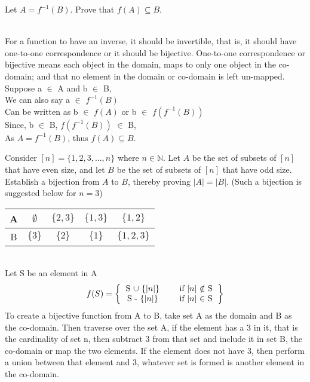\documentclass[addpoints]{exam}
\begin{document}
\begin{questions}
\begin{parts}
\begin{solution}
  \end{solution}

\end{parts}

\question[15] Let $A = f^{-1}(B)$. Prove that $f(A) \subseteq B$.
  \begin{solution}
    \\
    For a function to have an inverse, it should be invertible, that is, it should have one-to-one correspondence or it should be bijective. One-to-one correspondence or bijective means each object in the domain, maps to only one object in the co-domain; and that no element in the domain or co-domain is left un-mapped. \\ Suppose a $\in$ A and b $\in$ B, \\ We can also say a $\in$ $f^{-1}(B)$ \\ Can be written as b $\in$ $f(A)$ or b $\in$ $f(f^{-1}(B))$ \\ Since, b $\in$ B, \hspace{1cm} $f(f^{-1}(B))$ $\in$ B, \\ As $A = f^{-1}(B)$, thus $f(A) \subseteq B$.
  \end{solution}

\question[15] Consider $[n] = \{1,2,3,...,n\}$ where $n \in \mathbb{N}$. Let $A$ be the set of subsets of $[n]$ that have even size, and let $B$ be the set of subsets of $[n]$ that have odd size. Establish a bijection from $A$ to $B$, thereby proving $|A| = |B|$. (Such a bijection is suggested below for $n = 3$) 

\begin{center}

  \begin{tabular}{ |c || c | c | c |c |}
    \hline
 A & $\emptyset$ & $\{2,3\}$ & $\{1,3\}$ & $\{1,2\}$ \\ \hline
 B & $\{3\}$ & $\{2\}$ & $\{1\}$ & $\{1,2,3\}$\\\hline
\end{tabular}
\end{center}

  \begin{solution}
    \\ Let S be an element in A \\ \[ f(S) = 
\left \{
  \begin{tabular}{ccc}
   S $\cup$ $ \{|n|\} $ & & if $|n|$ $\notin$ S\\
   S - $ \{|n|\} $ & & if $|n|$ $\in$ S  \\
  \end{tabular}
\right \}
\] 
To create a bijective function from A to B, take set A as the domain and B as the co-domain. Then traverse over the set A, if the element has a 3 in it, that is the cardinality of set n, then subtract 3 from that set and include it in set B, the co-domain or map the two elements. If the element does not have 3, then perform a union between that element and 3, whatever set is formed is another element in the co-domain. 
  \end{solution}
  

\end{questions}
\end{document}
